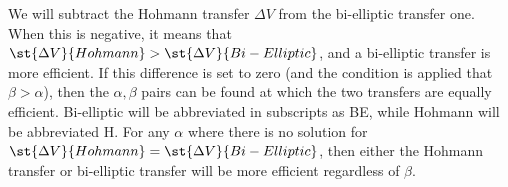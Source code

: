 \documentclass[../basicOrbitalDynamics.tex]{subfiles}
\begin{document}
\begin{comment}
\begin{align*}
    0 &= \left(\frac{\partial\Delta V}{\partial\beta}\right)_{\alpha>1,\alpha=\beta} \\
    0 &= \sqrt{\frac{\mu}{r_1}}\left(\frac{3\beta+1}{\sqrt{2\beta^3(1+\beta)^3}}-\frac{\alpha}{\sqrt{2\alpha\beta^3(\alpha+\beta)}}\right)_{\alpha=\beta} \\
    0 &=\sqrt{\frac{\mu}{r_1}}\left(\frac{3\alpha+1}{\sqrt{2\alpha^3(1+\alpha)^3}}-\frac{\alpha}{\sqrt{2\alpha\alpha^3(\alpha+\alpha)}}\right) \\
    0 &=\frac{3\alpha+1}{\sqrt{2\alpha^3(1+\alpha)^3}}-\frac{\alpha}{\sqrt{2\alpha\alpha^3(\alpha+\alpha)}} \\
    0 &=\frac{3\alpha+1}{\sqrt{2\alpha^3(1+\alpha)^3}}-\frac{1}{\sqrt{4\alpha^3}} \\
    \frac{3\alpha+1}{\sqrt{2\alpha^3(1+\alpha)^3}} &=\frac{1}{\sqrt{4\alpha^3}} \\
    \frac{3\alpha+1}{\sqrt{2\alpha^3(1+\alpha)^3}} &=\frac{2^{-1/2}(1+\alpha)^{3/2}}{\sqrt{2\alpha^3(1+\alpha)^3}} \\
    3\alpha+1&=2^{-1/2}(1+\alpha)^{3/2} \\
    9\alpha^2+6\alpha+1&=\frac{1}{2}(1+\alpha)^3 \\
    18\alpha^2+12\alpha+2 &=1+3\alpha+3\alpha^2+3\alpha^3 \\
    0 &=-\alpha^3+15\alpha^2+9\alpha+1
\end{align*}

This is not factorable. While there is a formula much like the quadratic formula that can solve cubics, it is a very long and unwieldy formula. Instead, this will be solved numerically. The single positive root of this cubic is
$$\alpha=15.58172\dots$$

Beyond this $\alpha$, a bi-elliptic transfer is \textit{always} more efficient than a Hohmann transfer, regardless of the transfer orbit apoapsis, and with the $\Delta V$ decreasing as $\beta$ increases. However, this is not the only time that a bi-elliptic transfer requires less $\Delta V$ than its simpler counterpart.
\end{comment}

We will subtract the Hohmann transfer $\Delta V$ from the bi-elliptic transfer one. When this is negative, it means that $\st{\Delta V}{Hohmann}>\st{\Delta V}{Bi-Elliptic}$, and a bi-elliptic transfer is more efficient. If this difference is set to zero (and the condition is applied that $\beta>\alpha$), then the $\alpha,\beta$ pairs can be found at which the two transfers are equally efficient. Bi-elliptic will be abbreviated in subscripts as BE, while Hohmann will be abbreviated H. For any $\alpha$ where there is no solution for $\st{\Delta V}{Hohmann}=\st{\Delta V}{Bi-Elliptic}$, then either the Hohmann transfer or bi-elliptic transfer will be more efficient regardless of $\beta$.
\end{document}

